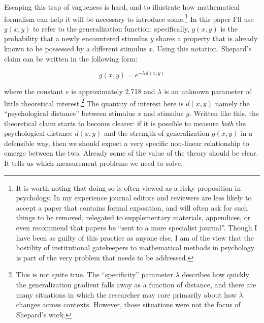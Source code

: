 \documentclass[
  english,
  doc]{apa6}
\begin{document}
Escaping this trap of vagueness is hard, and to illustrate how mathematical formalism can help it will be necessary to introduce some.\footnote{It is worth noting that doing so is often viewed as a risky proposition in psychology. In my experience journal editors and reviewers are less likely to accept a paper that contains formal exposition, and will often ask for such things to be removed, relegated to supplementary materials, appendices, or even recommend that papers be \enquote{sent to a more specialist journal}. Though I have been as guilty of this practice as anyone else, I am of the view that the hostility of institutional gatekeepers to mathematical methods in psychology is part of the very problem that needs to be addressed.} In this paper I'll use \(g(x, y)\) to refer to the generalization function: specifically, \(g(x, y)\) is the probability that a newly encountered stimulus \(y\) shares a property that is already known to be possessed by a different stimulus \(x\). Using this notation, Shepard's claim can be written in the following form:

\begin{equation}
g(x, y) = e^{-\lambda \, d(x, y)}
\end{equation}

\noindent
where the constant \(e\) is approximately 2.718 and \(\lambda\) is an unknown parameter of little theoretical interest.\footnote{This is not quite true. The \enquote{specificity} parameter \(\lambda\) describes how quickly the generalization gradient falls away as a function of distance, and there are many situations in which the researcher may care primarily about how \(\lambda\) changes across contexts. However, those situations were not the focus of Shepard's work.} The quantity of interest here is \(d(x, y)\) namely the \enquote{psychological distance} between stimulus \(x\) and stimulus \(y\). Written like this, the theoretical claim starts to become clearer: if it is possible to measure \emph{both} the psychological distance \(d(x, y)\) and the strength of generalization \(g(x, y)\) in a defensible way, then we should expect a very specific non-linear relationship to emerge between the two. Already some of the value of the theory should be clear. It tells us which measurement problems we need to solve.
\end{document}

